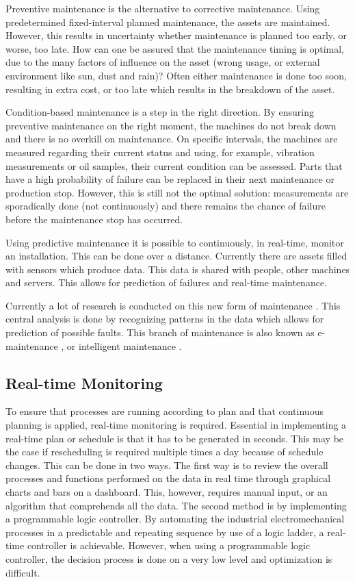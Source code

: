 Preventive maintenance is the alternative to corrective maintenance. Using predetermined fixed-interval planned maintenance, the assets are maintained. However, this results in uncertainty whether maintenance is planned too early, or worse, too late. How can one be assured that the maintenance timing is optimal, due to the many factors of influence on the asset (wrong usage, or external environment like sun, dust and rain)? Often either maintenance is done too soon, resulting in extra cost, or too late which results in the breakdown of the asset.

Condition-based maintenance is a step in the right direction. By ensuring preventive maintenance on the right moment, the machines do not break down and there is no overkill on maintenance. On specific intervals, the machines are measured regarding their current status and using, for example, vibration measurements or oil samples, their current condition can be assessed. Parts that have a high probability of failure can be replaced in their next maintenance or production stop. However, this is still not the optimal solution: measurements are sporadically done (not continuously) and there remains the chance of failure before the maintenance stop has occurred. 

Using predictive maintenance it is possible to continuously, in real-time, monitor an installation. This can be done over a distance. Currently there are assets filled with sensors which produce data. This data is shared with people, other machines and servers. This allows for prediction of failures and real-time maintenance. 

Currently a lot of research is conducted on this new form of maintenance \citep{muller2008concept}. This central analysis is done by recognizing patterns in the data which allows for prediction of possible faults. This branch of maintenance is also known as e-maintenance \citep{yu2003multi}, or intelligent maintenance \citep{vermaak2007multi}.


\subsection{Real-time Monitoring}
To ensure that processes are running according to plan and that continuous planning is applied, real-time monitoring is required. Essential in implementing a real-time plan or schedule is that it has to be generated in seconds. This may be the case if rescheduling is required multiple times a day because of schedule changes. This can be done in two ways. The first way is to review the overall processes and functions performed on the data in real time through graphical charts and bars on a dashboard. This, however, requires manual input, or an algorithm that comprehends all the data. The second method is by implementing a programmable logic controller. By automating the industrial electromechanical processes in a predictable and repeating sequence by use of a logic ladder, a real-time controller is achievable. However, when using a programmable logic controller, the decision process is done on a very low level and optimization is difficult.

